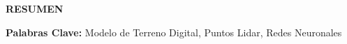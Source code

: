 \noindent \textbf{\large RESUMEN}
    
\noindent\lipsum[1-2]

\vspace{6pt}

\noindent\textbf{Palabras Clave:} Modelo de Terreno Digital, Puntos Lidar, Redes Neuronales
